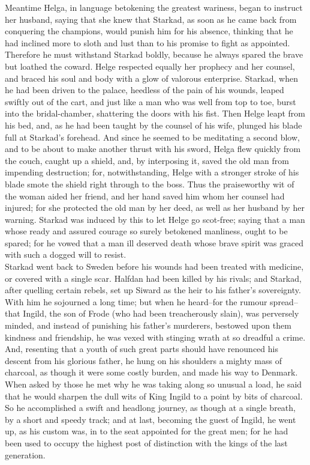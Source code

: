 \documentclass[10pt,a4paper]{report}
\begin{document}
Meantime Helga, in language betokening the greatest wariness, began to instruct her husband, saying that she knew that Starkad, as soon as he came back from conquering the champions, would punish him for his absence, thinking that he had inclined more to sloth and lust than to his promise to fight as appointed. Therefore he must withstand Starkad boldly, because he always spared the brave but loathed the coward. Helge respected equally her prophecy and her counsel, and braced his soul and body with a glow of valorous enterprise. Starkad, when he had been driven to the palace, heedless of the pain of his wounds, leaped swiftly out of the cart, and just like a man who was well from top to toe, burst into the bridal-chamber, shattering the doors with his fist. Then Helge leapt from his bed, and, as he had been taught by the counsel of his wife, plunged his blade full at Starkad's forehead. And since he seemed to be meditating a second blow, and to be about to make another thrust with his sword, Helga flew quickly from the couch, caught up a shield, and, by interposing it, saved the old man from impending destruction; for, notwithstanding, Helge with a stronger stroke of his blade smote the shield right through to the boss. Thus the praiseworthy wit of the woman aided her friend, and her hand saved him whom her counsel had injured; for she protected the old man by her deed, as well as her husband by her warning. Starkad was induced by this to let Helge go scot-free; saying that a man whose ready and assured courage so surely betokened manliness, ought to be spared; for he vowed that a man ill deserved death whose brave spirit was graced with such a dogged will to resist.\\

Starkad went back to Sweden before his wounds had been treated with medicine, or covered with a single scar. Halfdan had been killed by his rivals; and Starkad, after quelling certain rebels, set up Siward as the heir to his father's sovereignty. With him he sojourned a long time; but when he heard--for the rumour spread--that Ingild, the son of Frode (who had been treacherously slain), was perversely minded, and instead of punishing his father's murderers, bestowed upon them kindness and friendship, he was vexed with stinging wrath at so dreadful a crime. And, resenting that a youth of such great parts should have renounced his descent from his glorious father, he hung on his shoulders a mighty mass of charcoal, as though it were some costly burden, and made his way to Denmark. When asked by those he met why he was taking along so unusual a load, he said that he would sharpen the dull wits of King Ingild to a point by bits of charcoal. So he accomplished a swift and headlong journey, as though at a single breath, by a short and speedy track; and at last, becoming the guest of Ingild, he went up, as his custom was, in to the seat appointed for the great men; for he had been used to occupy the highest post of distinction with the kings of the last generation.\\
\end{document}
